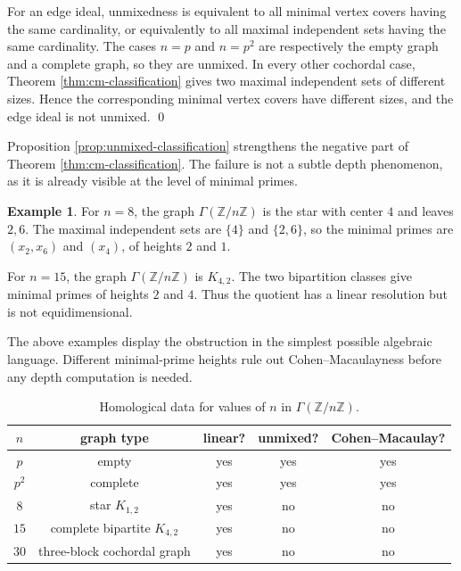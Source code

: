 \documentclass[12pt]{article}
\theoremstyle{definition}
\newtheorem{example}[theorem]{Example}
\renewenvironment{proof}{{\bf \noindent Proof.}}{\qed}
\begin{document}
\begin{proof}
For an edge ideal, unmixedness is equivalent to all minimal vertex covers having the same cardinality, or equivalently to all maximal independent sets having the same cardinality.  The cases $n=p$ and $n=p^2$ are respectively the empty graph and a complete graph, so they are unmixed.  In every other cochordal case, Theorem \ref{thm:cm-classification} gives two maximal independent sets of different sizes.  Hence the corresponding minimal vertex covers have different sizes, and the edge ideal is not unmixed.
\end{proof}

\medskip

Proposition \ref{prop:unmixed-classification} strengthens the negative part of Theorem \ref{thm:cm-classification}.  The failure is not a subtle depth phenomenon, as it is already visible at the level of minimal primes.




\medskip

\begin{example}\label{ex:minimal-primes-expanded}
For $n=8$, the graph $\Gamma(\mathbb{Z}/n\mathbb{Z})$ is the star with center $4$ and leaves $2,6$.  The maximal independent sets are $\{4\}$ and $\{2,6\}$, so the minimal primes are $(x_2,x_6)$ and $(x_4)$, of heights $2$ and $1$.

\medskip

For $n=15$, the graph $\Gamma(\mathbb{Z}/n\mathbb{Z})$ is $K_{4,2}$.  The two bipartition classes give minimal primes of heights $2$ and $4$.  Thus the quotient has a linear resolution but is not equidimensional.
\end{example}

\medskip

The above examples display the obstruction in the simplest possible algebraic language.  Different minimal-prime heights rule out Cohen--Macaulayness before any depth computation is needed.

\medskip

\begin{table}[H]
	\begin{center}
\begin{tabular}{ccccc}
\toprule
$n$ & graph type & linear? & unmixed? & Cohen--Macaulay?\\
\midrule
$p$ & empty & yes & yes & yes\\
$p^2$ & complete & yes & yes & yes\\
$8$ & star $K_{1,2}$ & yes & no & no\\
$15$ & complete bipartite $K_{4,2}$ & yes & no & no\\
$30$ & three-block cochordal graph & yes & no & no\\
\bottomrule
\end{tabular}
\end{center}
\caption{Homological data for values of $n$ in $\Gamma(\mathbb{Z}/n\mathbb{Z})$.}
\label{tab 7}
\end{table}
\end{document}
